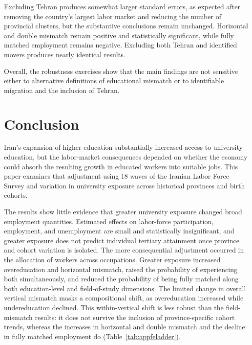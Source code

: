 Excluding Tehran produces somewhat larger standard errors, as expected after removing the country's largest labor market and reducing the number of provincial clusters, but the substantive conclusions remain unchanged. Horizontal and double mismatch remain positive and statistically significant, while fully matched employment remains negative. Excluding both Tehran and identified movers produces nearly identical results.

Overall, the robustness exercises show that the main findings are not sensitive either to alternative definitions of educational mismatch or to identifiable migration and the inclusion of Tehran.

\section{Conclusion}
\label{sec:conclusion}

Iran's expansion of higher education substantially increased access to university education, but the labor-market consequences depended on whether the economy could absorb the resulting growth in educated workers into suitable jobs. This paper examines that adjustment using 18 waves of the Iranian Labor Force Survey and variation in university exposure across historical provinces and birth cohorts.

The results show little evidence that greater university exposure changed broad employment quantities. Estimated effects on labor-force participation, employment, and unemployment are small and statistically insignificant, and greater exposure does not predict individual tertiary attainment once province and cohort variation is isolated. The more consequential adjustment occurred in the allocation of workers across occupations. Greater exposure increased overeducation and horizontal mismatch, raised the probability of experiencing both simultaneously, and reduced the probability of being fully matched along both education-level and field-of-study dimensions. The limited change in overall vertical mismatch masks a compositional shift, as overeducation increased while undereducation declined. This within-vertical shift is less robust than the field-mismatch results: it does not survive the inclusion of province-specific cohort trends, whereas the increases in horizontal and double mismatch and the decline in fully matched employment do (Table~\ref{tab:appfeladder}).

